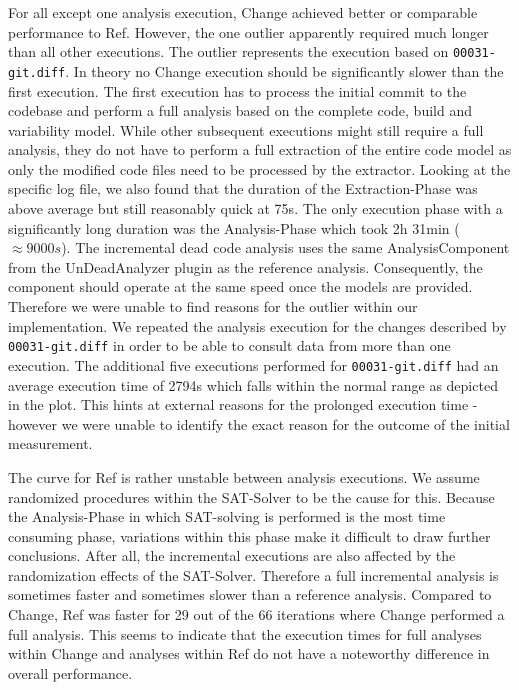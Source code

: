 \documentclass[a4paper]{article}
\begin{document}
For all except one analysis execution, Change achieved better or comparable performance to Ref. However, the one outlier apparently required much longer than all other executions. The outlier represents the execution based on \texttt{00031-git.diff}. In theory no Change execution should be significantly slower than the first execution. The first execution has to process the initial commit to the codebase and perform a full analysis based on the complete code, build and variability model. While other subsequent executions might still require a full analysis, they do not have to perform a full extraction of the entire code model as only the modified code files need to be processed by the extractor. 
Looking at the specific log file, we also found that the duration of the Extraction-Phase was above average but still reasonably quick at 75s. The only execution phase with a significantly long duration was the Analysis-Phase which took 2h 31min ($\approx 9000s$). The incremental dead code analysis uses the same AnalysisComponent from the UnDeadAnalyzer plugin as the reference analysis. Consequently, the component should operate at the same speed once the models are provided. Therefore we were unable to find reasons for the outlier within our implementation. We repeated the analysis execution for the changes described by \texttt{00031-git.diff} in order to be able to consult data from more than one execution. The additional five executions performed for \texttt{00031-git.diff} had an average execution time of 2794s which falls within the normal range as depicted in the plot. This hints at external reasons for the prolonged execution time - however we were unable to identify the exact reason for the outcome of the initial measurement.

The curve for Ref is rather unstable between analysis executions. We assume randomized procedures within the SAT-Solver to be the cause for this. Because the Analysis-Phase in which SAT-solving is performed is the most time consuming phase, variations within this phase make it difficult to draw further conclusions. After all, the incremental executions are also affected by the randomization effects of the SAT-Solver. Therefore a full incremental analysis is sometimes faster and sometimes slower than a reference analysis. Compared to Change, Ref was faster for 29 out of the 66 iterations where Change performed a full analysis. This seems to indicate that the execution times for full analyses within Change and analyses within Ref do not have a noteworthy difference in overall performance.
\end{document}

